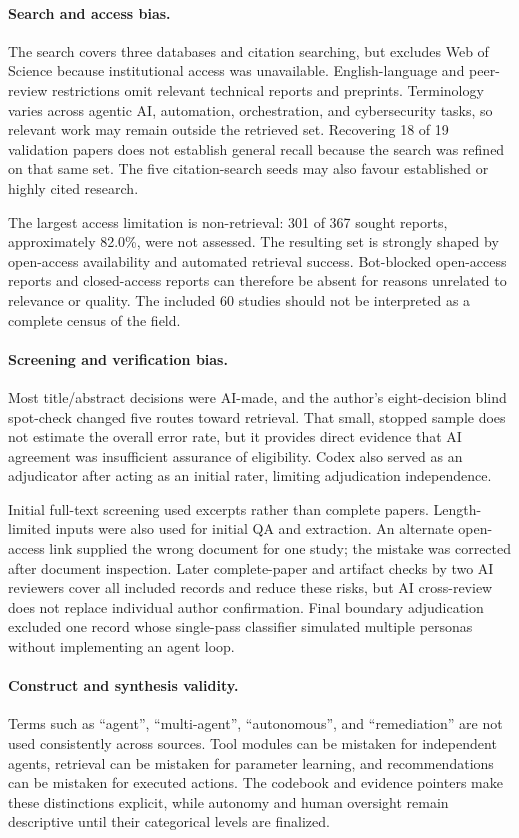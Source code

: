 \paragraph{Search and access bias.}
The search covers three databases and citation searching, but excludes Web of Science because institutional access was unavailable. English-language and peer-review restrictions omit relevant technical reports and preprints. Terminology varies across agentic AI, automation, orchestration, and cybersecurity tasks, so relevant work may remain outside the retrieved set. Recovering 18 of 19 validation papers does not establish general recall because the search was refined on that same set. The five citation-search seeds may also favour established or highly cited research.

The largest access limitation is non-retrieval: 301 of 367 sought reports, approximately 82.0\%, were not assessed. The resulting set is strongly shaped by open-access availability and automated retrieval success. Bot-blocked open-access reports and closed-access reports can therefore be absent for reasons unrelated to relevance or quality. The included 60 studies should not be interpreted as a complete census of the field.

\paragraph{Screening and verification bias.}
Most title/abstract decisions were AI-made, and the author's eight-decision blind spot-check changed five routes toward retrieval. That small, stopped sample does not estimate the overall error rate, but it provides direct evidence that AI agreement was insufficient assurance of eligibility. Codex also served as an adjudicator after acting as an initial rater, limiting adjudication independence.

Initial full-text screening used excerpts rather than complete papers. Length-limited inputs were also used for initial QA and extraction. An alternate open-access link supplied the wrong document for one study; the mistake was corrected after document inspection. Later complete-paper and artifact checks by two AI reviewers cover all included records and reduce these risks, but AI cross-review does not replace individual author confirmation. Final boundary adjudication excluded one record whose single-pass classifier simulated multiple personas without implementing an agent loop.

\paragraph{Construct and synthesis validity.}
Terms such as ``agent'', ``multi-agent'', ``autonomous'', and ``remediation'' are not used consistently across sources. Tool modules can be mistaken for independent agents, retrieval can be mistaken for parameter learning, and recommendations can be mistaken for executed actions. The codebook and evidence pointers make these distinctions explicit, while autonomy and human oversight remain descriptive until their categorical levels are finalized.

